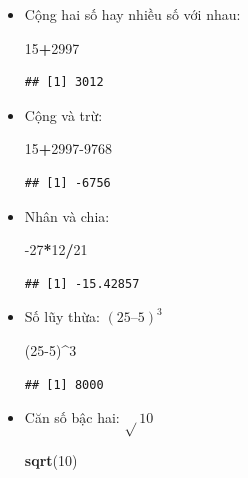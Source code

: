 \documentclass[
]{book}
\newenvironment{Shaded}{\begin{snugshade}}{\end{snugshade}}
\newcommand{\DecValTok}[1]{\textcolor[rgb]{0.00,0.00,0.81}{#1}}
\newcommand{\KeywordTok}[1]{\textcolor[rgb]{0.13,0.29,0.53}{\textbf{#1}}}
\newcommand{\NormalTok}[1]{#1}
\newcommand{\OperatorTok}[1]{\textcolor[rgb]{0.81,0.36,0.00}{\textbf{#1}}}
\begin{document}
\begin{itemize}
\item
  Cộng hai số hay nhiều số với nhau:

\begin{Shaded}
\begin{Highlighting}[]
\DecValTok{15}\OperatorTok{+}\DecValTok{2997}
\end{Highlighting}
\end{Shaded}

\begin{verbatim}
## [1] 3012
\end{verbatim}
\item
  Cộng và trừ:

\begin{Shaded}
\begin{Highlighting}[]
\DecValTok{15}\OperatorTok{+}\DecValTok{2997{-}9768}
\end{Highlighting}
\end{Shaded}

\begin{verbatim}
## [1] -6756
\end{verbatim}
\item
  Nhân và chia:

\begin{Shaded}
\begin{Highlighting}[]
\DecValTok{{-}27}\OperatorTok{*}\DecValTok{12}\OperatorTok{/}\DecValTok{21}
\end{Highlighting}
\end{Shaded}

\begin{verbatim}
## [1] -15.42857
\end{verbatim}
\item
  Số lũy thừa: \((25 – 5)^3\)

\begin{Shaded}
\begin{Highlighting}[]
\NormalTok{(}\DecValTok{25{-}5}\NormalTok{)}\OperatorTok{\^{}}\DecValTok{3}
\end{Highlighting}
\end{Shaded}

\begin{verbatim}
## [1] 8000
\end{verbatim}
\item
  Căn số bậc hai: \(\sqrt{}10\)

\begin{Shaded}
\begin{Highlighting}[]
\KeywordTok{sqrt}\NormalTok{(}\DecValTok{10}\NormalTok{)}
\end{Highlighting}
\end{Shaded}


\end{itemize}
\end{document}
